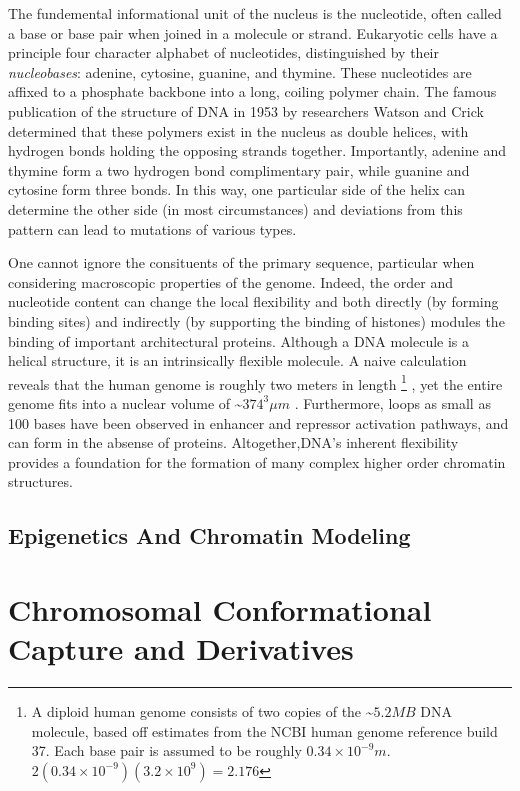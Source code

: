 \documentclass[phd,tocprelim]{cornell}
\begin{document}
The fundemental informational unit of the nucleus is the nucleotide, often
called a base or base pair when joined in a molecule or strand.  Eukaryotic
cells have a principle four character alphabet of nucleotides, distinguished
by their \textit{nucleobases}: adenine, cytosine, guanine, and thymine.  These
nucleotides are affixed to a phosphate backbone into a long, coiling polymer
chain.  The famous publication of the structure of DNA in 1953 by researchers
Watson and Crick determined that these polymers exist in the nucleus as double
helices\cite{watson1953}, with hydrogen bonds holding the opposing strands
together.  Importantly, adenine and thymine form a two hydrogen bond
complimentary pair, while guanine and cytosine form three bonds.  In this way,
one particular side of the helix can determine the other side (in most circumstances)
and deviations from this pattern can lead to mutations of various types\cite{cox2012}.

One cannot ignore the consituents of the primary sequence, particular when
considering macroscopic properties of the genome.  Indeed, the order and
nucleotide content can change the local flexibility and both directly (by
forming binding sites) and indirectly (by supporting the binding of histones)
modules the binding of important architectural proteins\cite{travers2004}.
Although a DNA molecule is a helical structure, it is an intrinsically
flexible molecule.  A naive calculation reveals that the human genome is
roughly two meters in length%
\footnote{%
  A diploid human genome consists of two copies of the \~{}$5.2MB$ DNA molecule,
  based off estimates from the NCBI human genome reference build 37.
  Each base pair is assumed to be roughly $0.34\times10^{-9}m$.
  $2(0.34 \times 10^{-9})(3.2 \times 10^9) = 2.176$
}
, yet the entire genome fits into a nuclear volume of \~{}$374^3\mu{}m$
\cite{marks2011}.  Furthermore, loops as small as 100 bases have been
observed in enhancer and repressor activation pathways\cite{wong2008}, and
can form in the absense of proteins\cite{vafabakhsh2012}.  Altogether,DNA's
inherent flexibility provides a foundation for the formation of many complex
higher order chromatin structures.

\subsection{Epigenetics And Chromatin Modeling}


\section{Chromosomal Conformational Capture and Derivatives}
\end{document}
